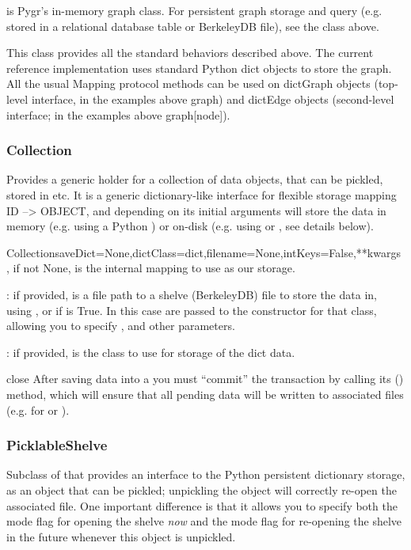 \documentclass{howto}
\begin{document}
 is Pygr's in-memory graph class.  For persistent
graph storage and query (e.g. stored in a relational database table
or BerkeleyDB file), see the  class above.

This class provides all the standard behaviors described above.  The current reference implementation uses standard Python dict objects to store the graph.  All the usual Mapping protocol methods can be used on dictGraph objects (top-level interface, in the examples above graph) and dictEdge objects (second-level interface; in the examples above graph[node]).

\subsubsection{Collection}
Provides a generic holder for a collection of data objects, that can be
pickled, stored in  etc.  It is a generic dictionary-like interface
for flexible storage mapping ID --> OBJECT, and depending on its 
initial arguments will store the data in memory (e.g. using a Python )
or on-disk (e.g. using  or , see details below).

\begin{funcdesc}{Collection}{saveDict=None,dictClass=dict,filename=None,intKeys=False,**kwargs}
  , if not None, is the internal mapping to use as our storage.
        
  : if provided, is a file path to a shelve (BerkeleyDB) file to
  store the data in, using , or  if 
  is True.  In this case  are passed to the constructor for that class,
  allowing you to specify ,  and other  parameters.

  : if provided, is the class to use for storage of the dict data.
\end{funcdesc}

\begin{funcdesc}{close}{}
  After saving data into a  you must ``commit'' the transaction
  by calling its () method, which will ensure that all pending data
  will be written to associated files (e.g. for  or ).
\end{funcdesc}


\subsubsection{PicklableShelve}
Subclass of  that 
provides an interface to the Python  persistent dictionary
storage, as an object that can be pickled; unpickling the object will 
correctly re-open the associated  file.  One important
difference is that it allows you to specify both the mode flag for opening
the shelve {\em now} and the mode flag for re-opening the shelve in the
future whenever this object is unpickled.  
\end{document}
